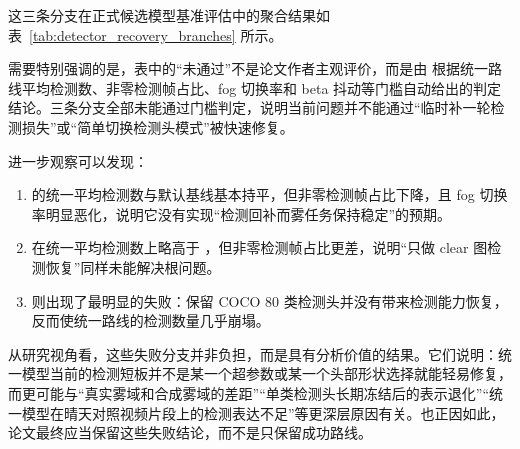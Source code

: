 这三条分支在正式候选模型基准评估中的聚合结果如表~\ref{tab:detector_recovery_branches} 所示。

\begin{table}[htbp]
  \centering
  \caption{三条检测能力回拉分支的候选 benchmark 结果}
  \label{tab:detector_recovery_branches}
  \scriptsize
\end{table}

需要特别强调的是，表中的“未通过”不是论文作者主观评价，而是由  根据统一路线平均检测数、非零检测帧占比、fog 切换率和 beta 抖动等门槛自动给出的判定结论。三条分支全部未能通过门槛判定，说明当前问题并不能通过“临时补一轮检测损失”或“简单切换检测头模式”被快速修复。

进一步观察可以发现：

\begin{enumerate}[leftmargin=2.5em]
\item {} 的统一平均检测数与默认基线基本持平，但非零检测帧占比下降，且 fog 切换率明显恶化，说明它没有实现“检测回补而雾任务保持稳定”的预期。
\item {} 在统一平均检测数上略高于 ，但非零检测帧占比更差，说明“只做 clear 图检测恢复”同样未能解决根问题。
\item {} 则出现了最明显的失败：保留 COCO 80 类检测头并没有带来检测能力恢复，反而使统一路线的检测数量几乎崩塌。
\end{enumerate}

从研究视角看，这些失败分支并非负担，而是具有分析价值的结果。它们说明：统一模型当前的检测短板并不是某一个超参数或某一个头部形状选择就能轻易修复，而更可能与“真实雾域和合成雾域的差距”“单类检测头长期冻结后的表示退化”“统一模型在晴天对照视频片段上的检测表达不足”等更深层原因有关。也正因如此，论文最终应当保留这些失败结论，而不是只保留成功路线。


